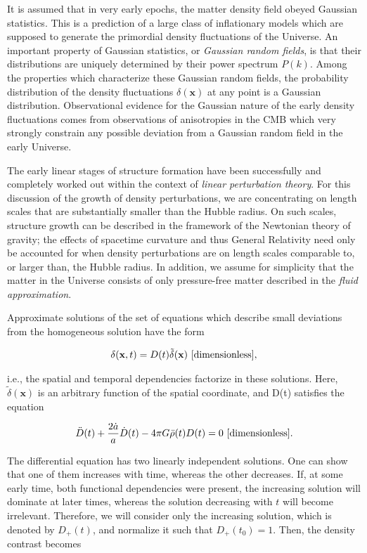 \documentclass[a4paper,11pt]{article}
\begin{document}
{\noindent}It is assumed that in very early epochs, the matter density field obeyed Gaussian statistics. This is a prediction of a large class of inflationary models which are supposed to generate the primordial density fluctuations of the Universe. An important property of Gaussian statistics, or \textit{Gaussian random fields}, is that their distributions are uniquely determined by their power spectrum $P(k)$. Among the properties which characterize these Gaussian random fields, the probability distribution of the density fluctuations $\delta(\mathbf{x})$ at any point is a Gaussian distribution. Observational evidence for the Gaussian nature of the early density fluctuations comes from observations of anisotropies in the CMB which very strongly constrain any possible deviation from a Gaussian random field in the early Universe.

{\noindent}The early linear stages of structure formation have been successfully and completely worked out within the context of \textit{linear perturbation theory}. For this discussion of the growth of density perturbations, we are concentrating on length scales that are substantially smaller than the Hubble radius. On such scales, structure growth can be described in the framework of the Newtonian theory of gravity; the effects of spacetime curvature and thus General Relativity need only be accounted for when density perturbations are on length scales comparable to, or larger than, the Hubble radius. In addition, we assume for simplicity that the matter in the Universe consists of only pressure-free matter described in the \textit{fluid approximation}.

{\noindent}Approximate solutions of the set of equations which describe small deviations from the homogeneous solution have the form

\begin{align*}
    \delta(\mathbf{x},t)=D(t)\tilde{\delta}(\mathbf{x}) ~ [{\rm dimensionless}],
\end{align*}

{\noindent}i.e., the spatial and temporal dependencies factorize in these solutions. Here, $\tilde{\delta}(\mathbf{x})$ is an arbitrary function of the spatial coordinate, and D(t) satisfies the equation

\begin{align*}
    \ddot{D}(t)+\frac{2\dot{a}}{a}\dot{D}(t)-4\pi G\bar{\rho}(t)D(t) = 0 ~ [{\rm dimensionless}].
\end{align*}

{\noindent}The differential equation has two linearly independent solutions. One can show that one of them increases with time, whereas the other decreases. If, at some early time, both functional dependencies were present, the increasing solution will dominate at later times, whereas the solution decreasing with $t$ will become irrelevant. Therefore, we will consider only the increasing solution, which is denoted by $D_+(t)$, and normalize it such that $D_+(t_0)=1$. Then, the density contrast becomes
\end{document}
